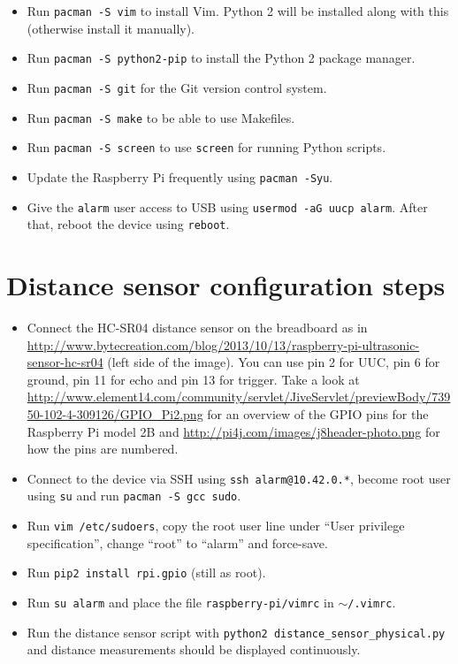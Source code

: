\documentclass{article}
\begin{document}
\begin{itemize}
    \item Run {\tt pacman -S vim} to install Vim. Python 2 will be installed 
          along with this (otherwise install it manually).
    \item Run {\tt pacman -S python2-pip} to install the Python 2 package 
          manager.
    \item Run {\tt pacman -S git} for the Git version control system.
    \item Run {\tt pacman -S make} to be able to use Makefiles.
    \item Run {\tt pacman -S screen} to use {\tt screen} for running Python
          scripts.
    \item Update the Raspberry Pi frequently using {\tt pacman -Syu}.
    \item Give the {\tt alarm} user access to USB using
          {\tt usermod -aG uucp alarm}. After that, reboot the device using
          {\tt reboot}.
\end{itemize}

\section{Distance sensor configuration steps}
\begin{itemize}
    \item Connect the HC-SR04 distance sensor on the breadboard as in
          \url{http://www.bytecreation.com/blog/2013/10/13/raspberry-pi-ultrasonic-sensor-hc-sr04}
          (left side of the image). You can use pin 2 for UUC, pin 6 for
          ground, pin 11 for echo and pin 13 for trigger. Take a look at
          \url{http://www.element14.com/community/servlet/JiveServlet/previewBody/73950-102-4-309126/GPIO_Pi2.png}
          for an overview of the GPIO pins for the Raspberry Pi model 2B and
          \url{http://pi4j.com/images/j8header-photo.png} for how the pins are
          numbered.
    \item Connect to the device via SSH using {\tt ssh alarm@10.42.0.*}, become
          root user using {\tt su} and run {\tt pacman -S gcc sudo}.
    \item Run {\tt vim /etc/sudoers}, copy the root user line under ``User
          privilege specification'', change ``root'' to ``alarm'' and
          force-save.
    \item Run {\tt pip2 install rpi.gpio} (still as root).
    \item Run {\tt su alarm} and place the file {\tt raspberry-pi/vimrc} in
          {\tt $\sim$/.vimrc}.
    \item Run the distance sensor script with {\tt python2 distance\_sensor\_physical.py}
          and distance measurements should be displayed continuously.
\end{itemize}
\end{document}
